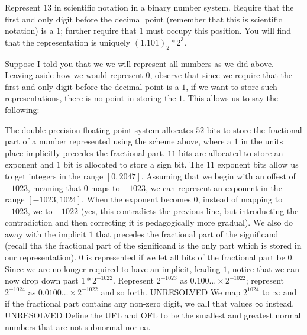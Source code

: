 \documentclass[../main.tex]{subfiles}
\begin{document}
\begin{example}
    Represent $13$ in scientific notation in a binary number system. Require that the first and only digit before the decimal point (remember that this is scientific notation) is a $1$; further require that $1$ must occupy this position.  You will find that the representation is uniquely $(1.101)_2 * 2^3$.
\end{example}

\begin{remark}
    Suppose I told you that we we will represent all numbers as we did above. Leaving aside how we would represent $0$, observe that since we require that the first and only digit before the decimal point is a $1$, if we want to store such representations, there is no point in storing the $1$. This allows us to say the following:
\end{remark}

\begin{definition}

    \begin{outline}
        \1 The double precision floating point system allocates $52$ bits to store the fractional part of a number represented using the scheme above, where a $1$ in the units place implicitly precedes the fractional part.
        \1 $11$ bits are allocated to store an exponent and $1$ bit is allocated to store a sign bit.
        \2 The $11$ exponent bits allow us to get integers in the range $[0,2047]$. Assuming that we begin with an offest of $-1023$,
        meaning that $0$ maps to $-1023$, we can represent an exponent in the range $[-1023, 1024]$.
        \1 When the exponent becomes $0$, instead of mapping to $-1023$, we to $-1022$ (yes, this contradicts the previous line, but
        introducting the contradiction and then correcting it is pedagogically more gradual). We also do away with the implicit $1$ that precedes
        the fractional part of the significand (recall tha the fractional part of the significand is the only part which is stored in our representation). $0$ is represented if we let all bits of the fractional part be $0$.
        \2 Since we are no longer required to have an implicit, leading $1$, notice that we can now drop down past $1 * 2^{-1022}$. Represent
        $2^{-1023}$ as $0.100\dots \times 2^{-1022}$; represent $2^{-1024}$ as $0.0100\dots \times 2^{-1022}$ and so forth. UNRESOLVED
        \1 We map $2^{1024}$ to $\infty$ and if the fractional part contains any non-zero digit, we call that values $\infty$ instead. UNRESOLVED
        \1 Define the UFL and OFL to be the smallest and greatest normal numbers that are not subnormal nor $\infty$.
    \end{outline}
\end{definition}
\end{document}
